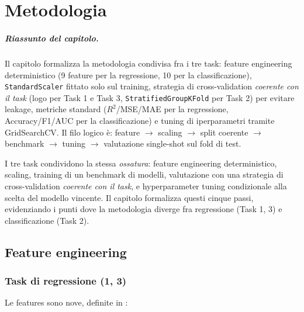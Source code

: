\chapter{Metodologia}
\label{chap:methodology}

\paragraph{Riassunto del capitolo.} Il capitolo formalizza la metodologia
condivisa fra i tre task: feature engineering deterministico (9 feature
per la regressione, 10 per la classificazione), \texttt{StandardScaler}
fittato solo sul training, strategia di cross-validation
\emph{coerente con il task} (\acrshort{logo} per Task 1 e Task 3,
\texttt{StratifiedGroupKFold} per Task 2) per evitare leakage,
metriche standard ($R^2$/MSE/MAE per la regressione, Accuracy/F1/AUC
per la classificazione) e tuning di iperparametri tramite GridSearchCV.
Il filo logico è: feature $\to$ scaling $\to$ split coerente $\to$
benchmark $\to$ tuning $\to$ valutazione single-shot sul fold di test.

I tre task condividono la stessa \emph{ossatura}: feature engineering
deterministico, scaling, training di un benchmark di modelli, valutazione
con una strategia di cross-validation \emph{coerente con il task}, e
hyperparameter tuning condizionale alla scelta del modello vincente. Il
capitolo formalizza questi cinque passi, evidenziando i punti dove la
metodologia diverge fra regressione (Task 1, 3) e classificazione (Task 2).

\newpage
\section{Feature engineering}

\subsection{Task di regressione (1, 3)}

Le features sono nove, definite in
:

